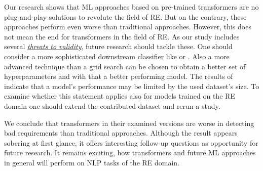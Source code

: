Our research shows that \ac{ML} approaches based on pre-trained transformers are no plug-and-play solutions to revolute the field of \ac{RE}.
But on the contrary, these approaches perform even worse than traditional approaches.
However, this does not mean the end for transformers in the field of \ac{RE}.
As our study includes several \hyperref[chp:threats_to_validity]{\textit{threats to validity}}, future research should tackle these.
One should consider a more sophisticated downstream classifier like \textcite{Martino:2019} or \textcite{Gao:2019}.
Also a more advanced technique than a grid search can be chosen to obtain a better set of hyperparameters and with that a better performing model.
The results of \textcite{Xu:2019} indicate that a model's performance may be limited by the used dataset's size.
To examine whether this statement applies also for models trained on the \ac{RE} domain one should extend the contributed dataset and rerun a study.

We conclude that transformers in their examined versions are worse in detecting bad requirements than traditional approaches.
Although the result appears sobering at first glance, it offers interesting follow-up questions as opportunity for future research.
It remains exciting, how transformers and future \ac{ML} approaches in general will perform on \ac{NLP} tasks of the \ac{RE} domain.
